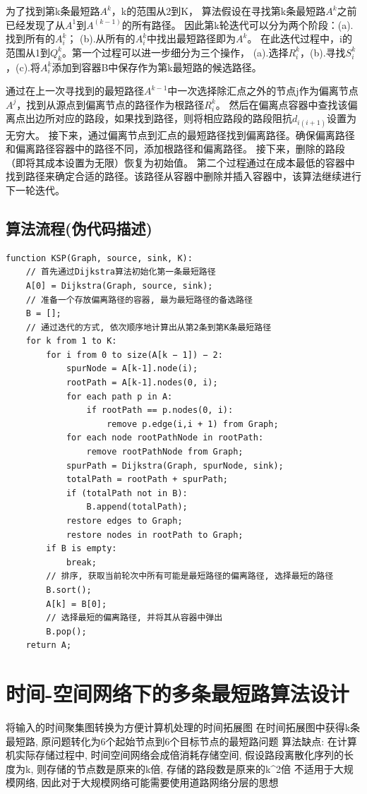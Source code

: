为了找到第k条最短路$A^k$，k的范围从2到K，
算法假设在寻找第k条最短路$A^k$之前已经发现了从$A^1$到$A^(k-1)$的所有路径。
因此第k轮迭代可以分为两个阶段：(a).找到所有的$A_i^k$；
(b).从所有的$A_i^k$中找出最短路径即为$A^k$。
在此迭代过程中，i的范围从1到$Q_k^k$。第一个过程可以进一步细分为三个操作，
(a).选择$R_i^k$，(b).寻找$S_i^k$，(c).将$A_i^k$添加到容器B中保存作为第k最短路的候选路径。

通过在上一次寻找到的最短路径$A^{k-1}$中一次选择除汇点之外的节点j作为偏离节点$A^j$，找到从源点到偏离节点的路径作为根路径$R^k_i$。
然后在偏离点容器中查找该偏离点出边所对应的路段，如果找到路径，则将相应路段的路段阻抗$d_{i(i+1)}$设置为无穷大。
接下来，通过偏离节点到汇点的最短路径找到偏离路径。确保偏离路径和偏离路径容器中的路径不同，添加根路径和偏离路径。
接下来，删除的路段（即将其成本设置为无限）恢复为初始值。
第二个过程通过在成本最低的容器中找到路径来确定合适的路径。该路径从容器中删除并插入容器中，该算法继续进行下一轮迭代。

\subsection{算法流程(伪代码描述)}\label{subsec:算法流程}
\begin{lstlisting}[label={lst:lstlisting7}]
function KSP(Graph, source, sink, K):
    // 首先通过Dijkstra算法初始化第一条最短路径
    A[0] = Dijkstra(Graph, source, sink);
    // 准备一个存放偏离路径的容器, 最为最短路径的备选路径
    B = [];
    // 通过迭代的方式, 依次顺序地计算出从第2条到第K条最短路径
    for k from 1 to K:
        for i from 0 to size(A[k − 1]) − 2:
            spurNode = A[k-1].node(i);
            rootPath = A[k-1].nodes(0, i);
            for each path p in A:
                if rootPath == p.nodes(0, i):
                    remove p.edge(i,i + 1) from Graph;
            for each node rootPathNode in rootPath:
                remove rootPathNode from Graph;
            spurPath = Dijkstra(Graph, spurNode, sink);
            totalPath = rootPath + spurPath;
            if (totalPath not in B):
                B.append(totalPath);
            restore edges to Graph;
            restore nodes in rootPath to Graph;
        if B is empty:
            break;
        // 排序, 获取当前轮次中所有可能是最短路径的偏离路径, 选择最短的路径
        B.sort();
        A[k] = B[0];
        // 选择最短的偏离路径, 并将其从容器中弹出
        B.pop();
    return A;
\end{lstlisting}


\section{时间-空间网络下的多条最短路算法设计}\label{sec:时间-空间网络下的多条最短路算法设计}
将输入的时间聚集图转换为方便计算机处理的时间拓展图
在时间拓展图中获得k条最短路, 原问题转化为6个起始节点到6个目标节点的最短路问题
算法缺点:
在计算机实际存储过程中, 时间空间网络会成倍消耗存储空间, 假设路段离散化序列的长度为k, 则存储的节点数是原来的k倍, 存储的路段数是原来的k^2倍
不适用于大规模网络, 因此对于大规模网络可能需要使用道路网络分层的思想

